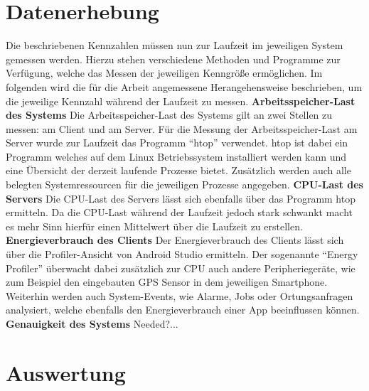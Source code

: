 \section{Datenerhebung}
Die beschriebenen Kennzahlen müssen nun zur Laufzeit im jeweiligen System gemessen werden.
Hierzu stehen verschiedene Methoden und Programme zur Verfügung, welche das Messen der jeweiligen Kenngröße ermöglichen.
Im folgenden wird die für die Arbeit angemessene Herangehensweise beschrieben, um die jeweilige Kennzahl während der Laufzeit zu messen.\newline\newline
\textbf{Arbeitsspeicher-Last des Systems}\newline
Die Arbeitsspeicher-Last des Systems gilt an zwei Stellen zu messen: am Client und am Server.
Für die Messung der Arbeitsspeicher-Last am Server wurde zur Laufzeit das Programm "`htop"' verwendet.
htop ist dabei ein Programm welches auf dem Linux Betriebssystem installiert werden kann und eine Übersicht der derzeit laufende Prozesse bietet.
Zusätzlich werden auch alle belegten Systemressourcen für die jeweiligen Prozesse angegeben.\newline\newline
\textbf{CPU-Last des Servers}\newline
Die CPU-Last des Servers lässt sich ebenfalls über das Programm htop ermitteln. 
Da die CPU-Last während der Laufzeit jedoch stark schwankt macht es mehr Sinn hierfür einen Mittelwert über die Laufzeit zu erstellen.\newline\newline
\textbf{Energieverbrauch des Clients}\newline
Der Energieverbrauch des Clients lässt sich über die Profiler-Ansicht von Android Studio ermitteln.
Der sogenannte "`Energy Profiler"' überwacht dabei zusätzlich zur CPU auch andere Peripheriegeräte, wie zum Beispiel den eingebauten GPS Sensor in dem jeweiligen Smartphone.
Weiterhin werden auch System-Events, wie Alarme, Jobs oder Ortungsanfragen analysiert, welche ebenfalls den Energieverbrauch einer App beeinflussen können.\newline\newline
\textbf{Genauigkeit des Systems}\newline
Needed?...

\newpage


\section{Auswertung}
